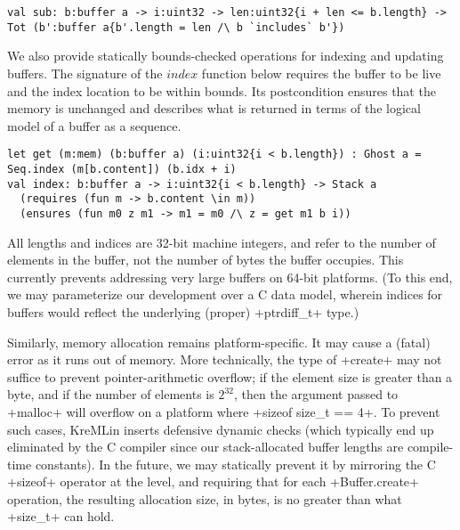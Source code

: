 
\begin{lstlisting}[numbers=none]
val sub: b:buffer a -> i:uint32 -> len:uint32{i + len <= b.length} -> Tot (b':buffer a{b'.length = len /\ b `includes` b'})
\end{lstlisting}


We also provide statically bounds-checked operations for indexing and
updating buffers. The signature of the \lst$index$ function below requires the
buffer to be live and the index location to be within bounds. Its
postcondition ensures that the memory is unchanged and describes what
is returned in terms of the logical model of a buffer as a sequence.

\begin{lstlisting}[numbers=none]
let get (m:mem) (b:buffer a) (i:uint32{i < b.length}) : Ghost a = Seq.index (m[b.content]) (b.idx + i)
val index: b:buffer a -> i:uint32{i < b.length} -> Stack a
  (requires (fun m -> b.content \in m))
  (ensures (fun m0 z m1 -> m1 = m0 /\ z = get m1 b i))
\end{lstlisting}

All lengths and indices are 32-bit machine integers, and refer to the number of
elements in the buffer, not the number of bytes the buffer occupies. 
%
This currently prevents addressing very large buffers on 64-bit platforms.
%
(To this end, we may parameterize our development over a C data model,
wherein indices for buffers would reflect the underlying (proper)
\li+ptrdiff_t+ type.)

Similarly, memory allocation remains platform-specific. 
%
It may cause a (fatal) error as it runs out of memory.
%
More technically, the type of \li+create+ may not suffice to prevent
pointer-arithmetic overflow; if the element size is greater than a
byte, and if the number of elements is $2^{32}$, then the argument
passed to \li+malloc+ will overflow on a platform where %
\li+sizeof size_t == 4+.
% 
To prevent such cases, KreMLin inserts defensive dynamic checks
(which typically end up eliminated by the C compiler since our
stack-allocated buffer lengths are compile-time constants).
%
In the future, we may statically prevent it by mirroring the C \li+sizeof+
operator at the \fstar level, and requiring that for each
\li+Buffer.create+ operation, the resulting allocation size, in bytes,
is no greater than what \li+size_t+ can hold.


